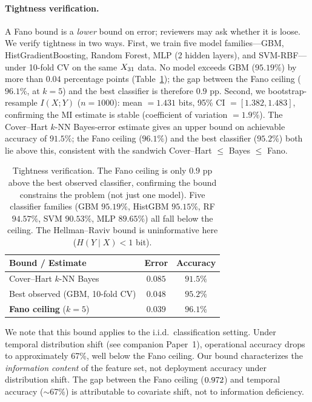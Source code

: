 \documentclass[11pt,a4paper]{article}
\begin{document}
\paragraph{Tightness verification.}
A Fano bound is a \emph{lower} bound on error; reviewers may ask whether
it is loose. We verify tightness in two ways. First, we train five model
families---GBM, HistGradientBoosting, Random Forest, MLP (2 hidden
layers), and SVM-RBF---under 10-fold CV on the same $X_{31}$
data. No model exceeds GBM ($95.19\%$) by more than $0.04$ percentage
points (Table~\ref{tab:tightness}); the gap between the Fano ceiling
($96.1\%$, at $k{=}5$) and the best classifier is therefore $0.9$ pp.
Second, we bootstrap-resample $I(X;Y)$ ($n{=}1000$): mean $= 1.431$
bits, 95\% CI $= [1.382, 1.483]$, confirming the MI estimate is stable
(coefficient of variation $= 1.9\%$). The Cover--Hart\cite{cover2006}
$k$-NN Bayes-error estimate gives an upper bound on achievable accuracy
of $91.5\%$; the Fano ceiling ($96.1\%$) and the best classifier
($95.2\%$) both lie above this, consistent with the sandwich
Cover--Hart $\leq$ Bayes $\leq$ Fano.

\begin{table}[t]
  \centering
  \small
  \begin{tabular}{lcc}
    \toprule
    Bound / Estimate & Error & Accuracy \\
    \midrule
    Cover--Hart $k$-NN Bayes  & $0.085$ & $91.5\%$ \\
    Best observed (GBM, 10-fold CV) & $0.048$ & $95.2\%$ \\
    \textbf{Fano ceiling} ($k{=}5$) & $\mathbf{0.039}$ & $\mathbf{96.1\%}$ \\
    \bottomrule
  \end{tabular}
  \caption{Tightness verification. The Fano ceiling is only $0.9$ pp
  above the best observed classifier, confirming the bound constrains
  the problem (not just one model). Five classifier families
  (GBM $95.19\%$, HistGBM $95.15\%$, RF $94.57\%$, SVM $90.53\%$,
  MLP $89.65\%$) all fall below the ceiling. The Hellman--Raviv bound
  is uninformative here ($H(Y \mid X) < 1$ bit).}
  \label{tab:tightness}
\end{table}

We note that this bound applies to the i.i.d.\ classification setting.
Under temporal distribution shift (see companion Paper~1), operational
accuracy drops to approximately 67\%, well below the Fano ceiling. Our
bound characterizes the \emph{information content} of the feature set, not
deployment accuracy under distribution shift. The gap between the Fano
ceiling ($0.972$) and temporal accuracy ($\sim$67\%) is attributable to
covariate shift, not to information deficiency.
\end{document}
